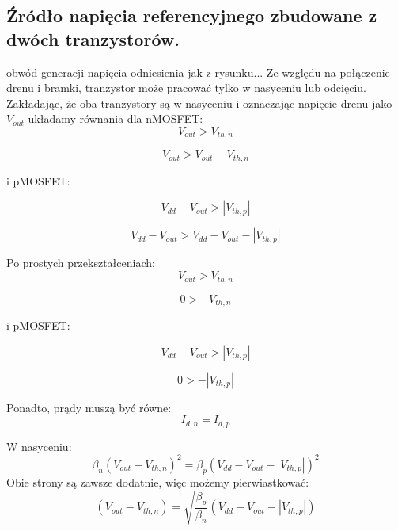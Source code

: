 \documentclass[10pt,a4paper]{report}
\theoremstyle{definition}
\theoremstyle{definition}
\theoremstyle{definition}
\theoremstyle{definition}
\theoremstyle{definition}
\begin{document}
	\subsection{Źródło napięcia referencyjnego zbudowane z dwóch tranzystorów.}
	obwód generacji napięcia odniesienia jak z rysunku...
	Ze względu na połączenie drenu i bramki, tranzystor może pracować tylko w nasyceniu lub odcięciu. Zakładając, że oba tranzystory
	są w nasyceniu i oznaczając napięcie drenu jako $V_{out}$ układamy równania dla nMOSFET:
	\begin{equation}
	V_{out} > V_{th,n}
	\end{equation}
	
	\begin{equation}
	V_{out} > V_{out} - V_{th,n}
	\end{equation}
	
	i pMOSFET:
	
	\begin{equation}
	V_{dd} - V_{out} > \left|V_{th,p}\right|
	\end{equation}
	
	\begin{equation}
	V_{dd} - V_{out} > V_{dd} - V_{out} - \left|V_{th,p}\right|
	\end{equation}
	
	Po prostych przekształceniach:
	\begin{equation}
	V_{out} > V_{th,n}
	\end{equation}
	
	\begin{equation}
	0 > - V_{th,n}
	\end{equation}
	
	i pMOSFET:
	
	\begin{equation}
	V_{dd} - V_{out} > \left|V_{th,p}\right|
	\end{equation}
	
	\begin{equation}
	0 > - \left|V_{th,p}\right|
	\end{equation}
	
	
	Ponadto, prądy muszą być równe:
	\begin{equation}
	I_{d,n} = I_{d,p}
	\end{equation}
	
	W nasyceniu:
	\begin{equation}
	\beta_n \left(V_{out} - V_{th,n}\right)^2 = \beta_p \left(V_{dd} - V_{out} - \left|V_{th,p}\right|\right)^2
	\end{equation}
	Obie strony są zawsze dodatnie, więc możemy pierwiastkować:
	\begin{equation}
	\left(V_{out} - V_{th,n}\right) = \sqrt{\frac{\beta_p}{\beta_n}}\left(V_{dd} - V_{out} - \left|V_{th,p}\right|\right)
	\end{equation}
	
\end{document}
